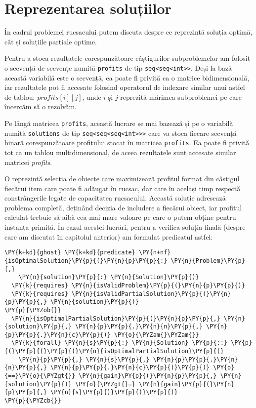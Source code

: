 \chapter{Reprezentarea soluțiilor}

\begin{sloppypar}

În cadrul problemei rucsacului putem discuta despre ce reprezintă soluția optimă, cât și soluțiile parțiale optime. \par
Pentru a stoca rezultatele corespunzătoare câștigurilor subproblemelor am folosit o secvență de secvențe numită \texttt{profits} de tip \texttt{seq<seq<int>>}. Deși la bază această variabilă este o secvență, ea poate fi privită ca o matrice bidimensională, iar rezultatele pot fi accesate folosind operatorul de indexare similar unui astfel de tablou: $\textit{profits}[i][j]$, unde $i$ și $j$ reprezită mărimea subproblemei pe care încercăm să o rezolvăm. 
\par
Pe lângă matricea \texttt{profits}, această lucrare se mai bazează și pe o variabilă numită \texttt{solutions} de tip \texttt{seq<seq<seq<int>>>} care va stoca fiecare secvență binară corespunzătoare profitului stocat în matricea \texttt{profits}. Ea poate fi privită tot ca un tablou multidimensional, de aceea rezultatele sunt accesate similar matricei \textit{profits}.
\par
O  reprezintă selecția de obiecte care maximizează profitul format din câștigul fiecărui item care poate fi adăugat în rucsac, dar care în același timp respectă constrângerile legate de capacitatea rucsacului. Această soluție adresează problema completă, deținând decizia de includere a fiecărui obiect, iar profitul calculat trebuie să aibă cea mai mare valoare pe care o putem obține pentru instanța primită.  În cazul acestei lucrări, pentru a verifica soluția finală (despre care am discutat în capitolul anterior) am formulat predicatul  astfel:
\begin{Verbatim}[commandchars=\\\{\}]
\PY{k+kd}{ghost} \PY{k+kd}{predicate} \PY{n+nf}{isOptimalSolution}\PY{p}{(}\PY{n}{p}\PY{p}{:} \PY{n}{Problem}\PY{p}{,} 
    \PY{n}{solution}\PY{p}{:} \PY{n}{Solution}\PY{p}{)}
  \PY{k}{requires} \PY{n}{isValidProblem}\PY{p}{(}\PY{n}{p}\PY{p}{)}
  \PY{k}{requires} \PY{n}{isValidPartialSolution}\PY{p}{(}\PY{n}{p}\PY{p}{,} \PY{n}{solution}\PY{p}{)}
\PY{p}{\PYZob{}}
  \PY{n}{isOptimalPartialSolution}\PY{p}{(}\PY{n}{p}\PY{p}{,} \PY{n}{solution}\PY{p}{,} \PY{n}{p}\PY{p}{.}\PY{n}{n}\PY{p}{,} \PY{n}{p}\PY{p}{.}\PY{n}{c}\PY{p}{)} \PY{o}{\PYZam{}\PYZam{}}
  \PY{k}{forall} \PY{n}{s}\PY{p}{:} \PY{n}{Solution} \PY{p}{::} \PY{p}{(}\PY{p}{(}\PY{p}{(}\PY{n}{isOptimalPartialSolution}\PY{p}{(}
    \PY{n}{p}\PY{p}{,} \PY{n}{s}\PY{p}{,} \PY{n}{p}\PY{p}{.}\PY{n}{n}\PY{p}{,} \PY{n}{p}\PY{p}{.}\PY{n}{c}\PY{p}{)}\PY{p}{)} \PY{o}{==}\PY{o}{\PYZgt{}} \PY{n}{gain}\PY{p}{(}\PY{n}{p}\PY{p}{,} \PY{n}{solution}\PY{p}{)} \PY{o}{\PYZgt{}=} \PY{n}{gain}\PY{p}{(}\PY{n}{p}\PY{p}{,} \PY{n}{s}\PY{p}{)}\PY{p}{)}\PY{p}{)}
\PY{p}{\PYZcb{}}
\end{Verbatim}


\end{sloppypar}

